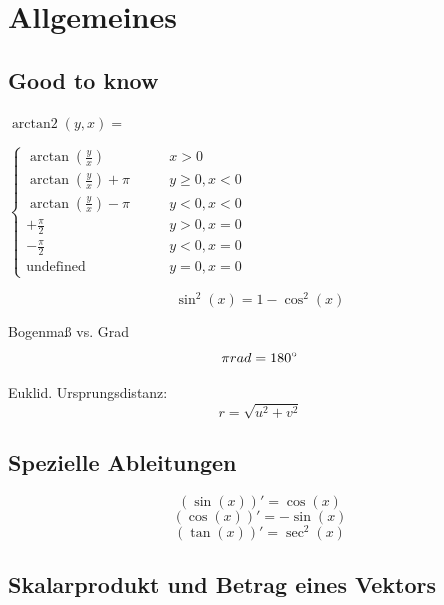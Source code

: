 

\UseHelveticaNeuetrue

\UseColumnstrue


\raggedcolumns







\section{Allgemeines}

\subsection{Good to know}

\begin{scriptsize}
$ \operatorname{arctan2}(y, x) = $

$ \begin{cases}
\arctan\left(\frac y x\right) & \qquad x > 0 \\
\arctan\left(\frac y x\right) + \pi& \qquad y \ge 0 , x < 0 \\
\arctan\left(\frac y x\right) - \pi& \qquad y < 0 , x < 0 \\
+\frac{\pi}{2} & \qquad y > 0 , x = 0 \\
-\frac{\pi}{2} & \qquad y < 0 , x = 0 \\
\text{undefined} & \qquad y = 0, x = 0
\end{cases} $
\end{scriptsize}

\[ \sin^2(x) = 1 - \cos^2(x) \]

Bogenmaß vs. Grad \[ \pi rad = 180\degree \]

Euklid. Ursprungsdistanz: \[ r = \sqrt{u^2 + v^2} \]


\subsection{Spezielle Ableitungen}

\[ (\sin(x))' = \cos(x) \]
\[ (\cos(x))' = -\sin(x) \]
\[ (\tan(x))' = \sec^2(x) \]



\subsection{Skalarprodukt und Betrag eines Vektors}

